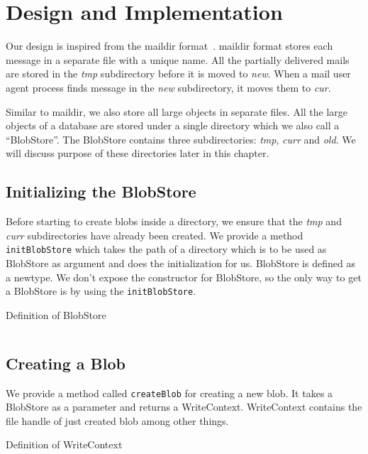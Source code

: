 \chapter{Design and Implementation}
\label{chap:design}

Our design is inspired from the maildir format~\cite{bernstein1995using}. maildir format stores each message in a separate file with a unique name. All the partially delivered mails are stored in the \textit{tmp} subdirectory before it is moved to \textit{new}. When a mail user agent process finds message in the \textit{new} subdirectory, it moves them to \textit{cur}.

Similar to maildir, we also store all large objects in separate files. All the large objects of a database are stored under a single directory which we also call a ``BlobStore''.
The BlobStore contains three subdirectories: \textit{tmp}, \textit{curr} and \textit{old}. We will discuss purpose of these directories later in this chapter.

\section{Initializing the BlobStore}
Before starting to create blobs inside a directory, we ensure that the \textit{tmp} and \textit{curr} subdirectories have already been created. We provide a method \texttt{initBlobStore} which takes the path of a directory which is to be used as BlobStore as argument and does the initialization for us.
BlobStore is defined as a newtype. We don't expose the constructor for BlobStore, so the only way to get a BlobStore is by using the \texttt{initBlobStore}.

\begin{program}
  \caption{Definition of BlobStore}
  \label{prog:defblobstore}
  \inputminted{haskell}{hs/blobstore.hs}
\end{program}

\section{Creating a Blob}
We provide a method called \texttt{createBlob} for creating a new blob. It takes a BlobStore as a parameter and returns a WriteContext. WriteContext contains the file handle of just created blob among other things.

\begin{program}
  \caption{Definition of WriteContext}
  \label{prog:defwritecontext}
  \inputminted{haskell}{hs/writecontext.hs}
\end{program}

